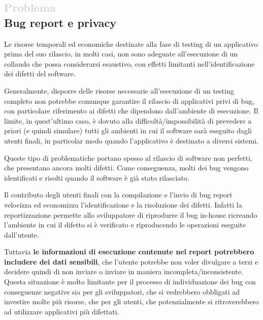
\subsection*{\textcolor{lightgray}{\normalsize{Problema}} \\ Bug report e privacy}

Le risorse temporali ed economiche destinate alla fase di testing di un applicativo prima del suo rilascio, in molti casi, non sono adeguate all'esecuzione di un collaudo che possa considerarsi esaustivo, con effetti limitanti nell'identificazione dei difetti del software.

Generalmente, disporre delle risorse necessarie all'esecuzione di un testing completo non potrebbe comunque garantire il rilascio di applicativi privi di bug, con  particolare riferimento ai difetti che dipendono dall'ambiente di esecuzione. Il limite, in quest'ultimo caso, è dovuto alla difficoltà/impossibilità di prevedere a priori (e quindi simulare) tutti gli ambienti in cui il software sarà eseguito dagli utenti finali, in particolar modo quando l'applicativo è destinato a diversi sistemi. 

Queste tipo di problematiche portano spesso al rilascio di software non perfetti, che presentano ancora molti difetti. Come conseguenza, molti dei bug vengono identificati e risolti quando il software è già stato rilasciato. 

Il contributo degli utenti finali con la compilazione e l'invio di bug report velocizza ed economizza l'identificazione e la risoluzione dei difetti. Infatti la reportizzazione permette allo sviluppatore di riprodurre il bug in-house ricreando l'ambiente in cui il difetto si è verificato e riproducendo le operazioni eseguite dall'utente. %

 Tuttavia \textbf{le informazioni di esecuzione contenute nel report potrebbero includere dei dati sensibili}, che l'utente potrebbe non voler divulgare a terzi e decidere quindi di non inviare o inviare in maniera incompleta/inconsistente. Questa situazione è molto limitante per il processo di individuazione dei bug con conseguenze negative sia per gli sviluppatori, che si vedrebbero obbligati ad investire molte più risorse, che per gli utenti, che potenzialmente si ritroverebbero ad utilizzare applicativi più difettati.

